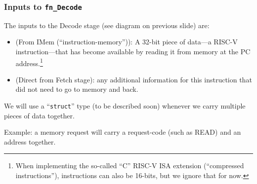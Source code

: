 
\begin{frame}
\frametitle{Inputs to {\tt fn\_Decode}}

\footnotesize

The inputs to the Decode stage (see diagram on previous slide) are:

\PAUSE{\vspace{1ex}}

\begin{itemize}

 \item (From IMem (``instruction-memory'')): A 32-bit piece of data---a
 RISC-V instruction---that has become available by reading it from
 memory at the PC address.\footnote{When
 implementing the so-called ``C'' RISC-V ISA extension (``compressed
 instructions''), instructions can also be 16-bits, but we
 ignore that for now.}

 \PAUSE{\vspace{4ex}}

 \item (Direct from Fetch stage): any additional information for this
     instruction that did not need to go to memory and back.

\end{itemize}

\PAUSE{\vspace{4ex}}

We will use a {\BSV} ``{\tt struct}'' type (to be described soon)
whenever we carry multiple pieces of data together.

\vspace{1ex}

Example: a memory request will carry a request-code (such as READ) and
an address together.

\end{frame}



